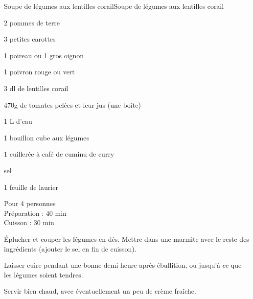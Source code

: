 \begin{recette}{Soupe de légumes aux lentilles corail}{Soupe de légumes aux lentilles corail}

\begin{ingredients}
2 pommes de terre\par
3 petites carottes\par
1 poireau ou 1 gros oignon\par
1 poivron rouge ou vert\par
3 dl de lentilles corail\par
470g de tomates pelées et leur jus (une boîte)\par
1 L d’eau\par
1 bouillon cube aux légumes\par
1 cuillerée à café de cuminu de curry\par
sel\par
1 feuille de laurier\par
\end{ingredients}

\begin{infos}
Pour 4 personnes\\
Préparation : 40 min\\
Cuisson : 30 min\\
\end{infos}

\begin{etapes}
\item Éplucher et couper les légumes en dés. Mettre dans une marmite avec le reste des ingrédients (ajouter le sel en fin de cuisson).
\item Laisser cuire pendant une bonne demi-heure après ébullition, ou jusqu’à ce que les légumes soient tendres.
\item Servir bien chaud, avec éventuellement un peu de crème fraîche.
\end{etapes}

\end{recette}